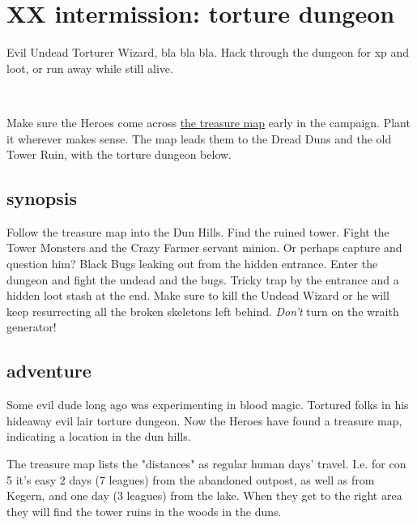 \clearpage
\section*{XX intermission: torture dungeon}
\label{xxtorturedungeon}

Evil Undead Torturer Wizard, bla bla bla. Hack through the dungeon for xp and loot, or run away while still alive.

\

Make sure the Heroes come across \hyperref[appendixtreasuremap]{the treasure map} early in the campaign. Plant it wherever makes sense. The map leads them to the Dread Duns and the old Tower Ruin, with the torture dungeon below.


\subsection*{synopsis}

Follow the treasure map into the Dun Hills. Find the ruined tower. Fight the Tower Monsters and the Crazy Farmer servant minion. Or perhaps capture and question him? Black Bugs leaking out from the hidden entrance. Enter the dungeon and fight the undead and the bugs. Tricky trap by the entrance and a hidden loot stash at the end. Make sure to kill the Undead Wizard or he will keep resurrecting all the broken skeletons left behind. \emph{Don't} turn on the wraith generator!


\subsection*{adventure}

Some evil dude long ago was experimenting in blood magic. Tortured folks in his hideaway evil lair torture dungeon. Now the Heroes have found a treasure map, indicating a location in the dun hills.


The treasure map lists the "distances" as regular human days' travel. I.e. for con 5 it's easy 2 days (7 leagues) from the abandoned outpost, as well as from Kegern, and one day (3 leagues) from the lake.
When they get to the right area they will find the tower ruins in the woods in the duns.

